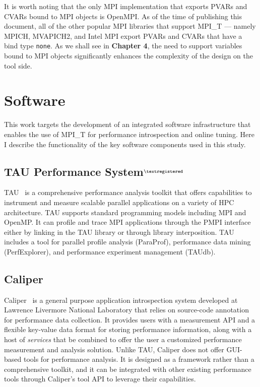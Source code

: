 \par It is worth noting that the only MPI implementation that exports PVARs and CVARs bound to MPI objects is OpenMPI. As of the time of publishing this document, all of the other popular MPI libraries that support MPI\_T --- namely MPICH, MVAPICH2, and Intel MPI export PVARs and CVARs that have a bind type \verb+none+. As we shall see in \textbf{Chapter 4}, the need to support variables bound to MPI objects significantly enhances the complexity of the design on the tool side.

\section {Software}
This work targets the development of an integrated software infrastructure that enables the use of MPI\_T for performance introspection and online tuning. Here I describe the functionality of the key software components used in this study.
\subsection{TAU Performance System$^{\textregistered}$}
TAU~\cite{Shende:2006:TPP:1125980.1125982} is a comprehensive performance analysis toolkit that offers capabilities to instrument and measure scalable parallel applications on a variety of HPC architecture.
TAU supports standard programming models including MPI and OpenMP. It can profile and trace MPI applications through the PMPI interface either by linking in the TAU library or through library interposition.
TAU includes a tool for parallel profile analysis (ParaProf), performance data mining (PerfExplorer), and performance experiment management (TAUdb).

\subsection {Caliper}
Caliper~\cite{CALIPER} is a general purpose application introspection system developed at Lawrence Livermore National Laboratory that relies on source-code annotation for performance data collection. It provides users with a measurement API and a flexible key-value data format for storing performance information, along with a host of \textit{services} that be combined to offer the user a customized performance measurement and analysis solution. Unlike TAU, Caliper does not offer GUI-based tools for performance analysis. It is designed as a framework rather than a comprehensive toolkit, and it can be integrated with other existing performance tools through Caliper's tool API to leverage their capabilities.

